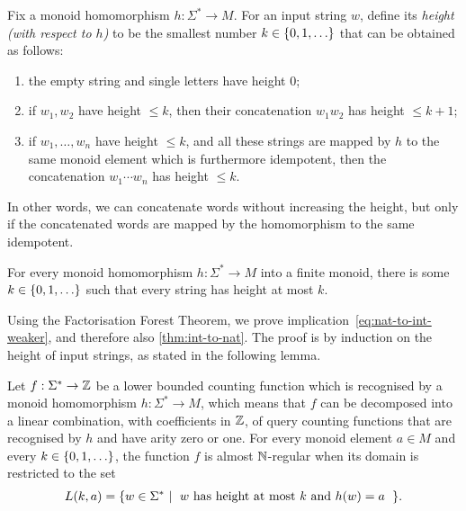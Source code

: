     \begin{definition}
        [Height]     Fix a monoid homomorphism $h : \Sigma^* \to M$. For an input string $w$,  define its \emph{height (with respect to $h$)} to be the smallest number $k \in \{0,1,\ldots\}$ that can be obtained as follows:
\begin{enumerate}
    \item the empty string and single letters have  height $0$;
    \item if $w_1,w_2$ have height  $\leq k$, then their concatenation $w_1w_2$ has height  $\leq k+1$;
    \item if $w_1,\ldots,w_n$ have height $ \leq k$, and all these strings are mapped by $h$ to the same monoid element which is furthermore idempotent, 
 then the concatenation $w_1 \cdots w_n$ has height  $\leq k$.
\end{enumerate}
    \end{definition}

In other words, we can concatenate words without increasing the height, but only if the concatenated words are mapped by the homomorphism to the same idempotent. 

\begin{theorem}
      For every monoid homomorphism $h : \Sigma^* \to M$ into a finite monoid, there is some $k \in \{0,1,\ldots\}$ such that every string has height at most $k$.
\end{theorem}

Using the Factorisation Forest Theorem, we prove implication~\eqref{eq:nat-to-int-weaker}, and therefore also \cref{thm:int-to-nat}. The proof is  by induction on the height of input strings, as stated in the following lemma.      

\begin{lemma}\label{lem:induction-on-height}
    Let $f : \Sigma^* \to {\mathbb Z}$ be a lower bounded counting function which is recognised by a  monoid homomorphism $h : \Sigma^* \to M$, which means that $f$ can be decomposed into a linear combination, with coefficients in ${\mathbb Z}$, of query counting functions that are recognised by $h$ and have arity zero or one. For every monoid element $a \in M$ and every $k \in \{0,1,\ldots\}$, the function $f$ is almost ${\mathbb N}$-regular when its domain is restricted to the set
    \begin{align*}
    L(k,a) = \setbuild{ w \in \Sigma^*}{$w$ has height at most $k$ and $h(w) = a$}.
    \end{align*}
\end{lemma}

